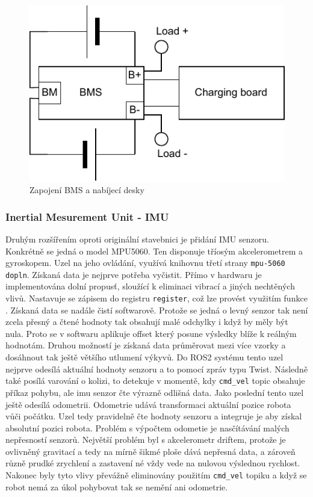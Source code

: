 \begin{figure}[h!]
	\centering
	\includegraphics[scale=0.75]{obrazky-figures/battery_circuite.pdf}
	\caption{Zapojení BMS a nabíjecí desky}
	\label{}
\end{figure}

\subsubsection*{Inertial Mesurement Unit - IMU}
Druhým rozšířením oproti originální stavebnici je přidání IMU senzoru. Konkrétně se jedná o model MPU5060. Ten disponuje tříosým akcelerometrem a gyroskopem. Uzel na jeho ovládání, využívá knihovnu třetí strany \verb|mpu-5060 dopln|. Získaná data je nejprve potřeba vyčistit. Přímo v hardwaru je implementována dolní propusť, sloužící k eliminaci vibrací a jiných nechtěných vlivů. Nastavuje se zápisem do registru \verb|register|, což lze provést využitím funkce \verb||. Získaná data se nadále čistí softwarově. Protože se jedná o levný senzor tak není zcela přesný a čtené hodnoty tak obsahují malé odchylky i když by měly být nula. Proto se v softwaru aplikuje offset který posune výsledky blíže k reálným hodnotám. Druhou možností je získaná data průměrovat mezi více vzorky a dosáhnout tak ještě většího utlumení výkyvů. Do ROS2 systému tento uzel nejprve odesílá aktuální hodnoty senzoru a to pomocí zpráv typu Twist. Následně také posílá varování o kolizi, to detekuje v momentě, kdy \verb|cmd_vel| topic obsahuje příkaz pohybu, ale imu senzor čte výrazně odlišná data. Jako poslední tento uzel ještě odesílá odometrii. Odometrie udává transformaci aktuální pozice robota vůči počátku. Uzel tedy pravidelně čte hodnoty senzoru a integruje je aby získal absolutní pozici robota. Problém s výpočtem odometie je nasčítávání malých nepřesností senzorů. Největší problém byl s akcelerometr driftem, protože je ovlivněný gravitací a tedy na mírně šikmé ploše dává nepřesná data, a zároveň různě prudké zrychlení a zastavení né vždy vede na nulovou výslednou rychlost. Nakonec byly tyto vlivy převážně eliminovány použitím \verb|cmd_vel| topiku a když se robot nemá za úkol pohybovat tak se nemění ani odometrie. 

